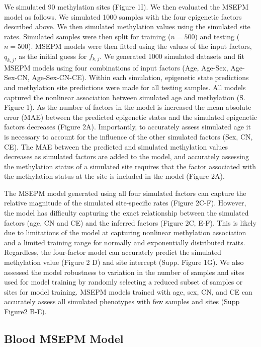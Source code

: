 \documentclass{article}
\begin{document}
{\begin{linenumbers}
We simulated 90 methylation sites (Figure 1I). We then evaluated the MSEPM model as follows. 
We simulated 1000 samples with the four epigenetic factors described above. We then simulated methylation values
 using the simulated site rates. Simulated samples were then split for training ($n=500$) and testing ($n=500$).
  MSEPM models were then fitted using the values of the input factors, $q_{k,j}$, as the initial guess for
   $f_{k,j}$. We generated 1000 simulated datasets and fit MSEPM models using four combinations of input 
   factors (Age, Age-Sex, Age-Sex-CN, Age-Sex-CN-CE). Within each simulation, epigenetic state predictions and 
   methylation site predictions were made for all testing samples. All models captured the nonlinear association 
   between simulated age and methylation (S. Figure 1). As the number of factors in the model is increased the mean 
   absolute error (MAE) between the predicted epigenetic states and the simulated epigenetic factors decreases 
   (Figure 2A). Importantly, to accurately assess simulated age it is necessary to account for the influence of 
   the other simulated factors (Sex, CN, CE). The MAE between the predicted and simulated methylation values decreases 
   as simulated factors are added to the model, and accurately assessing the methylation status of a simulated site 
   requires that the factor associated with the methylation status at the site is included in the model (Figure 2A). 

The MSEPM model generated using all four simulated factors can capture the relative magnitude of the simulated 
site-specific rates (Figure 2C-F).  However, the model has difficulty capturing the exact relationship between the 
simulated factors (age, CN and CE) and the inferred factors (Figure 2C, E-F). This is likely due to limitations of 
the model at capturing nonlinear methylation association and a limited training range for normally and exponentially 
distributed traits. Regardless, the four-factor model can accurately predict the simulated methylation value 
(Figure 2 D) and site intercept (Supp. Figure 1G). We also assessed the model robustness to variation in the 
number of samples and sites used for model training by randomly selecting a reduced subset of samples or sites for 
model training. MSEPM models trained with age, sex, CN, and CE can accurately assess all simulated phenotypes with 
few samples and sites (Supp Figure2 B-E). 

\subsection{Blood MSEPM Model}


\end{linenumbers}}
\end{document}
